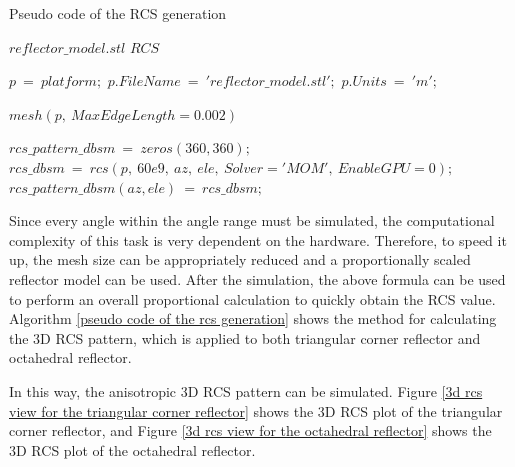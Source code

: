 \documentclass[12pt,DIV14,BCOR12mm,a4paper,footinclude=false,headinclude,parskip=half-,twoside,openright,cleardoublepage=empty,toc=index,bibliography=totoc,listof=totoc]{scrreprt}
\numberwithin{equation}{chapter}
\begin{document}
\begin{algorithm}
    \caption{Pseudo code of the RCS generation}
    \label{pseudo code of the rcs generation}
    \renewcommand{\algorithmicrequire}{\textbf{Input:}}
    \renewcommand{\algorithmicensure}{\textbf{Output:}}
    
    \begin{algorithmic}[1]
        \REQUIRE $reflector\_model.stl$
        \ENSURE $RCS$

        \STATE $p\ =\ platform;$
        \STATE $p.FileName\ =\ 'reflector\_model.stl';$
        \STATE $p.Units\ =\ 'm';$
        
        \STATE $mesh(p,\ MaxEdgeLength=0.002)$
        
        \STATE $rcs\_pattern\_dbsm\ =\ zeros(360, 360);$
                \STATE $rcs\_dbsm\ =\ rcs(p,\ 60e9,\ az,\ ele,\ Solver='MOM',\ EnableGPU=0);$
                \STATE $rcs\_pattern\_dbsm(az, ele)\ =\ rcs\_dbsm;$
            \ENDFOR
        \ENDFOR
        
    \end{algorithmic}   
\end{algorithm}

Since every angle within the angle range must be simulated, the computational complexity of this task is very dependent on the hardware. Therefore, to speed it up, the mesh size can be appropriately reduced and a proportionally scaled reflector model can be used. After the simulation, the above formula can be used to perform an overall proportional calculation to quickly obtain the RCS value. Algorithm \ref{pseudo code of the rcs generation} shows the method for calculating the 3D RCS pattern, which is applied to both triangular corner reflector and octahedral reflector.

In this way, the anisotropic 3D RCS pattern can be simulated. Figure \ref{3d rcs view for the triangular corner reflector} shows the 3D RCS plot of the triangular corner reflector, and Figure \ref{3d rcs view for the octahedral reflector} shows the 3D RCS plot of the octahedral reflector.
\end{document}
